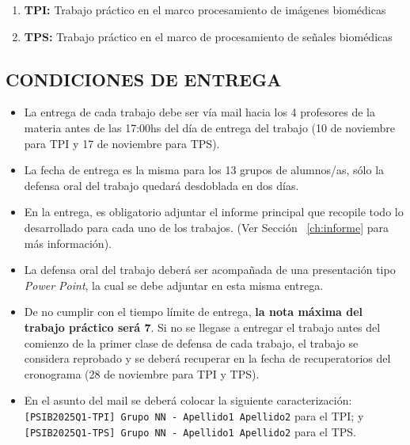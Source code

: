 \documentclass[10pt]{article}
\begin{document}
\begin{enumerate}
    \item \textbf{TPI:} Trabajo práctico en el marco procesamiento de imágenes biomédicas
    \item \textbf{TPS:} Trabajo práctico en el marco de procesamiento de señales biomédicas
\end{enumerate}

\vspace{0.25cm}

\subsection{CONDICIONES DE ENTREGA}

\begin{itemize}
    \item La entrega de cada trabajo debe ser vía mail hacia los 4 profesores de la materia antes de las 17:00hs del día de entrega del trabajo (10 de noviembre para TPI y 17 de noviembre para TPS).

    \item La fecha de entrega es la misma para los 13 grupos de alumnos/as, sólo la defensa oral del trabajo quedará desdoblada en dos días.
    
    \item En la entrega, es obligatorio adjuntar el informe principal que recopile todo lo desarrollado para cada uno de los trabajos. (Ver Sección ~\ref{ch:informe} para más información).
    
    \item La defensa oral del trabajo deberá ser acompañada de una presentación tipo \textit{Power Point}, la cual se debe adjuntar en esta misma entrega.
    
    \item De no cumplir con el tiempo límite de entrega, \textbf{la nota máxima del trabajo práctico será 7}. Si no se llegase a entregar el trabajo antes del comienzo de la primer clase de defensa de cada trabajo, el trabajo se considera reprobado y se deberá recuperar en la fecha de recuperatorios del cronograma (28 de noviembre para TPI y TPS).
    
    \item En el asunto del mail se deberá colocar la siguiente caracterización: \texttt{[PSIB2025Q1-TPI] Grupo NN - Apellido1 Apellido2} para el TPI; y \texttt{[PSIB2025Q1-TPS] Grupo NN - Apellido1 Apellido2} para el TPS.
\end{itemize}
\end{document}
